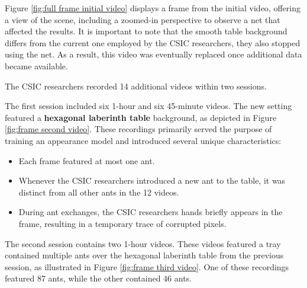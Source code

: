 {
    Figure \ref{fig:full frame initial video} displays a frame from the initial video, 
    offering a view of the scene, including a zoomed-in perspective to observe a net that affected the results. 
    It is important to note that the smooth table background differs from the current one employed by the \ac{CSIC} researchers, they also stopped using the net. 
    As a result, this video was eventually replaced once additional data became available.
}

{
    The \ac{CSIC} researchers recorded 14 additional videos within two sessions.
}
 
{
    The first session included six 1-hour and six 45-minute videos. 
    The new setting featured a \textbf{hexagonal laberinth table} background, as depicted in Figure \ref{fig:frame second video}. 
    These recordings primarily served the purpose of training an appearance model and introduced several unique characteristics:
}

\begin{itemize}
    \item Each frame featured at most one ant.
    \item Whenever the \ac{CSIC} researchers introduced a new ant to the table, it was distinct from all other ants in the 12 videos.
    \item During ant exchanges, the \ac{CSIC} researchers hands briefly appears in the frame, resulting in a temporary trace of corrupted pixels.
\end{itemize}

{
    The second session contains two 1-hour videos. 
    These videos featured a tray contained multiple ants over the hexagonal laberinth table from the previous session, 
    as illustrated in Figure \ref{fig:frame third video}. 
    One of these recordings featured 87 ants, while the other contained 46 ants.
}

